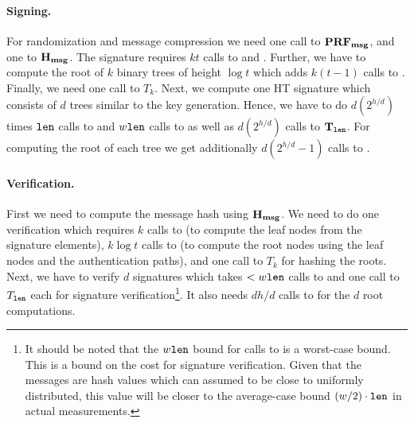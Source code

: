 \paragraph{Signing.} For randomization and message compression we need one call to
$\mathbf{PRF_{msg}}$, and one to $\mathbf{H_{msg}}$. The \fors signature requires
$kt$ calls to \sphincsPRF and \sphincsF. Further, we have to compute the root of
$k$ binary trees of height $\log t$ which adds $k(t - 1)$ calls to \sphincsH.
Finally, we need one call to $T_k$. Next, we compute one HT signature which
consists of $d$ trees similar to the key generation. Hence, we have to do
$d(2^{h/d})$ times $\texttt{len}$ calls to \sphincsPRF and $w\texttt{len}$ calls to \sphincsF
as well as $d(2^{h/d})$ calls to $\mathbf{T}_\texttt{len}$. For computing
the root of each tree we get additionally $d(2^{h/d} - 1)$ calls to \sphincsH.

\paragraph{Verification.} First we need to compute the message hash using
$\mathbf{H_{msg}}$. We need to do one \fors verification which requires
$k$ calls to %
\sphincsF (to compute the leaf nodes from the signature elements), $k\log t$ calls to \sphincsH (to compute the root nodes using the leaf nodes and the authentication paths), and one call
to $T_k$ for hashing the roots. Next, we have to verify $d$ \xmss signatures
which takes $<w\texttt{len}$ calls to \sphincsF and one call to $T_\texttt{len}$ each for \wotsp
signature verification\footnote{It should be noted that the $w\texttt{len}$ bound for calls to \sphincsF is a worst-case bound. This is a bound on the cost for \wots signature verification. Given that the messages are hash values which can assumed to be close to uniformly distributed, this value will be closer to the average-case bound $(w/2) \cdot \texttt{len}$ in actual measurements.}. It also needs $dh/d$ calls to \sphincsH for the $d$
root computations.

